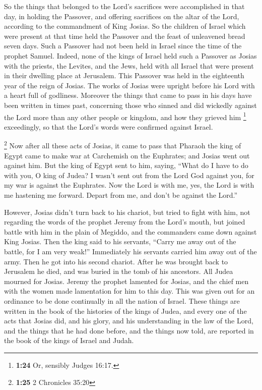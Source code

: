  So the things that belonged to the Lord's sacrifices
were accomplished in that day, in holding the Passover, 
and offering sacrifices on the altar of the Lord, according to the
commandment of King Josias.  So the children of Israel
which were present at that time held the Passover and the feast of
unleavened bread seven days.  Such a Passover had not
been held in Israel since the time of the prophet Samuel.
 Indeed, none of the kings of Israel held such a Passover
as Josias with the priests, the Levites, and the Jews, held with all
Israel that were present in their dwelling place at Jerusalem.
 This Passover was held in the eighteenth year of the
reign of Josias.  The works of Josias were upright before
his Lord with a heart full of godliness.  Moreover the
things that came to pass in his days have been written in times past,
concerning those who sinned and did wickedly against the Lord more than
any other people or kingdom, and how they grieved him \footnote{\textbf{1:24}
  Or, sensibly Judges 16:17.} exceedingly, so that the Lord's words were
confirmed against Israel.

 \footnote{\textbf{1:25} 2 Chronicles 35:20} Now after
all these acts of Josias, it came to pass that Pharaoh the king of Egypt
came to make war at Carchemish on the Euphrates; and Josias went out
against him.  But the king of Egypt sent to him, saying,
``What do I have to do with you, O king of Judea?  I
wasn't sent out from the Lord God against you, for my war is against the
Euphrates. Now the Lord is with me, yes, the Lord is with me hastening
me forward. Depart from me, and don't be against the Lord.''

 However, Josias didn't turn back to his chariot, but
tried to fight with him, not regarding the words of the prophet Jeremy
from the Lord's mouth,  but joined battle with him in the
plain of Megiddo, and the commanders came down against King Josias.
 Then the king said to his servants, ``Carry me away out
of the battle, for I am very weak!'' Immediately his servants carried
him away out of the army.  Then he got into his second
chariot. After he was brought back to Jerusalem he died, and was buried
in the tomb of his ancestors.  All Judea mourned for
Josias. Jeremy the prophet lamented for Josias, and the chief men with
the women made lamentation for him to this day. This was given out for
an ordinance to be done continually in all the nation of Israel.
 These things are written in the book of the histories of
the kings of Judea, and every one of the acts that Josias did, and his
glory, and his understanding in the law of the Lord, and the things that
he had done before, and the things now told, are reported in the book of
the kings of Israel and Judah.

